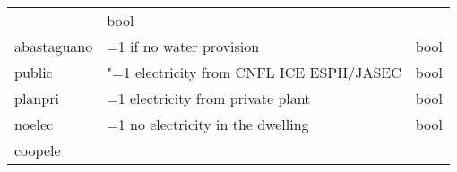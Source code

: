 \documentclass[11pt]{article}
\begin{document}
\begin{longtable}[]{@{}lll@{}}
\begin{minipage}[t]{0.16\columnwidth}
\end{minipage} & \begin{minipage}[t]{0.24\columnwidth}\raggedright\strut
bool\strut
\end{minipage}\tabularnewline
\begin{minipage}[t]{0.19\columnwidth}\raggedright\strut
abastaguano\strut
\end{minipage} & \begin{minipage}[t]{0.16\columnwidth}\raggedright\strut
=1 if no water provision\strut
\end{minipage} & \begin{minipage}[t]{0.24\columnwidth}\raggedright\strut
bool\strut
\end{minipage}\tabularnewline
\begin{minipage}[t]{0.19\columnwidth}\raggedright\strut
public\strut
\end{minipage} & \begin{minipage}[t]{0.16\columnwidth}\raggedright\strut
"=1 electricity from CNFL ICE ESPH/JASEC\strut
\end{minipage} & \begin{minipage}[t]{0.24\columnwidth}\raggedright\strut
bool\strut
\end{minipage}\tabularnewline
\begin{minipage}[t]{0.19\columnwidth}\raggedright\strut
planpri\strut
\end{minipage} & \begin{minipage}[t]{0.16\columnwidth}\raggedright\strut
=1 electricity from private plant\strut
\end{minipage} & \begin{minipage}[t]{0.24\columnwidth}\raggedright\strut
bool\strut
\end{minipage}\tabularnewline
\begin{minipage}[t]{0.19\columnwidth}\raggedright\strut
noelec\strut
\end{minipage} & \begin{minipage}[t]{0.16\columnwidth}\raggedright\strut
=1 no electricity in the dwelling\strut
\end{minipage} & \begin{minipage}[t]{0.24\columnwidth}\raggedright\strut
bool\strut
\end{minipage}\tabularnewline
\begin{minipage}[t]{0.19\columnwidth}\raggedright\strut
coopele\strut
\end{minipage} & \begin{minipage}[t]{0.16\columnwidth}\raggedright\strut

\end{minipage}
\end{longtable}
\end{document}

